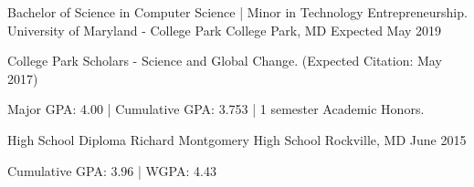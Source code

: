 

\begin{cventries}

  \cventry
    {Bachelor of Science in Computer Science  |  Minor in Technology Entrepreneurship.} %
    {University of Maryland - College Park} %
    {College Park, MD} %
    {Expected May 2019} %
    {
      \begin{cvitems} %
          \item {College Park Scholars - Science and Global Change. (Expected Citation: May 2017)}
          \item {Major GPA: 4.00 | Cumulative GPA: 3.753 | 1 semester Academic Honors.}
      \end{cvitems}
    }
    
    \cventry
    {High School Diploma} %
    {Richard Montgomery High School} %
    {Rockville, MD} %
    {June 2015} %
    {
      \begin{cvitems} %
         \item {Cumulative GPA: 3.96 | WGPA: 4.43}
      \end{cvitems}
    }

\end{cventries}
